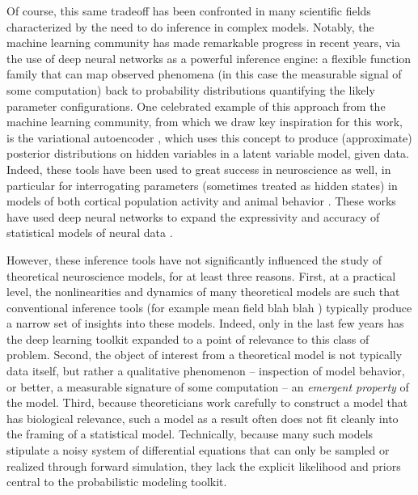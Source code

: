 \documentclass[11pt]{article}
\begin{document}
Of course, this same tradeoff has been confronted in many scientific fields characterized by the need to do inference in complex models.  
Notably, the machine learning community has made remarkable progress in recent years, via the use of deep neural networks as a powerful inference engine: a flexible function family that can map observed phenomena (in this case the measurable signal of some computation) back to probability distributions quantifying the likely parameter configurations.  
One celebrated example of this approach from the machine learning community, from which we draw key inspiration for this work, is the variational autoencoder \cite{kingma2013auto, rezende2015variational}, which uses this concept to produce (approximate) posterior distributions on hidden variables in a latent variable model, given data. 
Indeed, these tools have been used to great success in neuroscience as well, in particular for interrogating parameters (sometimes treated as hidden states) in models of both cortical population activity \cite{gao2016linear, zhao2017recursive, barello2018sparse, pandarinath2018inferring} and animal behavior \cite{wiltschko2015mapping, johnson2016composing, batty2019behavenet}. 
These works have used deep neural networks to expand the expressivity and accuracy of statistical models of neural data \cite{paninski2018neural}. 

However, these inference tools have not significantly influenced the study of theoretical neuroscience models, for at least three reasons.  
First, at a practical level, the nonlinearities and dynamics of many theoretical models are such that conventional inference tools (for example mean field blah blah \cite{???}) typically produce a narrow set of insights into these models.  
Indeed, only in the last few years has the deep learning toolkit expanded to a point of relevance to this class of problem.
Second, the object of interest from a theoretical model is not typically data itself, but rather a qualitative phenomenon -- inspection of model behavior, or better, a measurable signature of some computation -- an \emph{emergent property} of the model.  
Third, because theoreticians work carefully to construct a model that has biological relevance, such a model as a result often does not fit cleanly into the framing of a statistical model.  
Technically, because many such models stipulate a noisy system of differential equations that can only be sampled or realized through forward simulation, they lack the explicit likelihood and priors central to the probabilistic modeling toolkit.  
\end{document}
